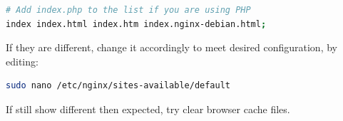 \begin{description}[style=nextline]
\begin{lstlisting}[frame=none,language=bash,backgroundcolor=\color{gray!15},numbers=none,		basicstyle=\ttfamily]
# Add index.php to the list if you are using PHP
index index.html index.htm index.nginx-debian.html;
\end{lstlisting}
If they are different, change it accordingly to meet desired configuration, by editing: \begin{lstlisting}[frame=none,language=bash,backgroundcolor=\color{gray!15},numbers=none,		basicstyle=\ttfamily]
sudo nano /etc/nginx/sites-available/default
\end{lstlisting}
If still show different then expected, try clear browser cache files.
\end{description}
